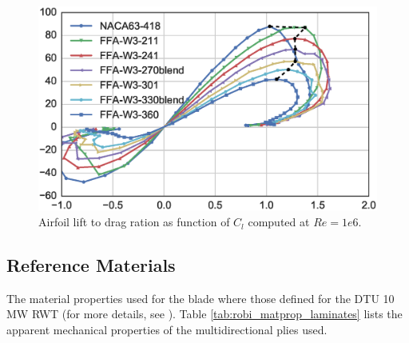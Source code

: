 \begin{figure}[!ht]
\begin{center}
	\includegraphics[width=0.8\linewidth]{figures/KB_airfoil_data_clcd_detail.eps}
\end{center}
\caption{Airfoil lift to drag ration as function of $C_l$ computed at $Re=1e6$.}
\label{fig:baseline_LD}
\end{figure}

\clearpage

\subsection{Reference Materials}
\label{sec:reference_mats}

The material properties used for the blade where those defined for the DTU 10 MW RWT (for more details, see \cite{DTU10MW}).
Table \ref{tab:robi_matprop_laminates} lists the apparent mechanical properties of the multidirectional plies used. 

